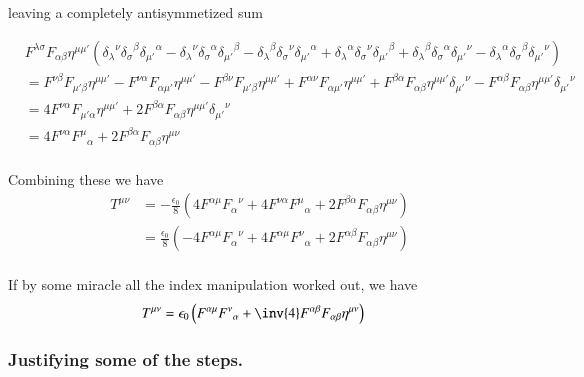 \documentclass{article}
\begin{document}
leaving a completely antisymmetized sum

\begin{align*}
&
F^{\lambda\sigma} F_{\alpha\beta} 
\eta^{\mu\mu'} 
(
{\delta_\lambda}^\nu {\delta_\sigma}^\beta {\delta_{\mu'}}^\alpha
-{\delta_\lambda}^\nu {\delta_\sigma}^\alpha {\delta_{\mu'}}^\beta
-{\delta_\lambda}^\beta {\delta_\sigma}^\nu {\delta_{\mu'}}^\alpha
+{\delta_\lambda}^\alpha {\delta_\sigma}^\nu {\delta_{\mu'}}^\beta
+{\delta_\lambda}^\beta {\delta_\sigma}^\alpha {\delta_{\mu'}}^\nu
-{\delta_\lambda}^\alpha {\delta_\sigma}^\beta {\delta_{\mu'}}^\nu
) \\
&=
  F^{\nu\beta} F_{{\mu'}\beta} \eta^{\mu\mu'} 
- F^{\nu\alpha} F_{\alpha{\mu'}} \eta^{\mu\mu'}
- F^{\beta\nu} F_{{\mu'}\beta} \eta^{\mu\mu'} 
+ F^{\alpha\nu} F_{\alpha{\mu'}} \eta^{\mu\mu'} 
+ F^{\beta\alpha} F_{\alpha\beta} \eta^{\mu\mu'} {\delta_{\mu'}}^\nu
- F^{\alpha\beta} F_{\alpha\beta} \eta^{\mu\mu'} {\delta_{\mu'}}^\nu
 \\
&=
4 F^{\nu\alpha} F_{{\mu'}\alpha} \eta^{\mu\mu'} 
+ 2 F^{\beta\alpha} F_{\alpha\beta} \eta^{\mu\mu'} {\delta_{\mu'}}^\nu
 \\
&=
4 F^{\nu\alpha} {F^{\mu}}_{\alpha} 
+ 2 F^{\beta\alpha} F_{\alpha\beta} \eta^{\mu\nu} 
 \\
\end{align*}

Combining these we have
\begin{align*}
T^{\mu\nu}
&= 
-\frac{\epsilon_0}{8} \left(
 4 F^{\alpha\mu} {F_{\alpha}}^{\nu} 
+ 4 F^{\nu\alpha} {F^{\mu}}_{\alpha} 
+ 2 F^{\beta\alpha} F_{\alpha\beta} \eta^{\mu\nu} 
\right) \\
&= 
\frac{\epsilon_0}{8} \left(
- 4 F^{\alpha\mu} {F_{\alpha}}^{\nu} 
+ 4 F^{\alpha\mu} {F^{\nu}}_{\alpha}
+ 2 F^{\alpha\beta} F_{\alpha\beta} \eta^{\mu\nu} 
\right) \\
\end{align*}


If by some miracle all the index manipulation worked out, we have
\begin{align}\label{eqn:miracle}
T^{\mu\nu} &= {\epsilon_0} \left( F^{\alpha\mu} {F^{\nu}}_{\alpha} + \inv{4} F^{\alpha\beta} F_{\alpha\beta} \eta^{\mu\nu} \right)
\end{align}

\subsubsection{ Justifying some of the steps. }
\end{document}
